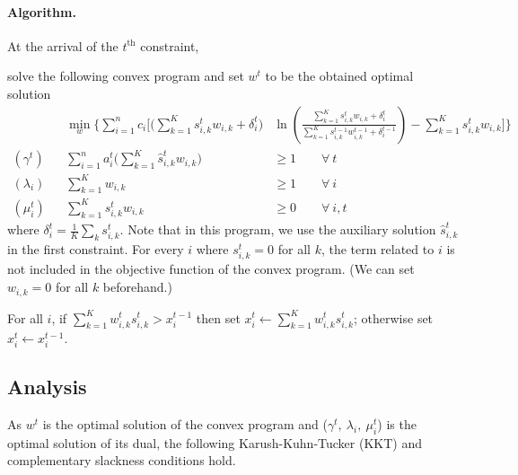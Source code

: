 \clearpage

\paragraph{Algorithm.}

At the arrival of the $t^{\text{th}}$ constraint,
\begin{compactenum}
	\item solve the following convex program and set $w^t$ to be the obtained optimal solution
%
\begin{align*}
&& \min_{w} \biggl\{\sum_{i=1}^{n} c_{i}  \biggl[  \biggl(\sum_{k=1}^{K} s_{i,k}^{t} w_{i,k}  + \delta_{i}^{t} \biggr) &
					 \ln \left( \frac{\sum_{k=1}^{K} s_{i,k}^{t} w_{i,k}  + \delta_{i}^{t}}{ \sum_{k=1}^{K}  s_{i,k}^{t-1}w_{i,k}^{t-1}  + \delta_{i}^{t-1}}  \right)
					 		- \sum_{k=1}^{K}  s_{i,k}^{t} w_{i,k} \biggr] \biggr\} \\
    (\gamma^{t})  && \sum_{i=1}^{n} a_{i}^{t} \biggl( \sum_{k=1}^{K}  \hat{s}_{i,k}^{t} w_{i,k} \biggr) &\geq 1 \qquad \forall\ t\\
%
    (\lambda_{i}) && \sum_{k=1}^{K}  w_{i,k} &\geq 1 \qquad \forall\ i\\
%
    (\mu_{i}^{t}) && \sum_{k=1}^{K} s_{i,k}^{t} w_{i,k} &\geq 0 \qquad \forall\ i,t
\end{align*}
%
where $\delta_{i}^{t} = \frac{1}{K} \sum_{k} s_{i,k}^{t}$.
Note that in this program, we use the auxiliary solution $\hat{s}_{i,k}^{t}$ in the first constraint. For every $i$ where $s_{i,k}^{t} = 0$ for all $k$, the term related to $i$ is not included in the objective function of the convex program.
(We can set $w_{i,k} = 0$ for all $k$ beforehand.)
	\item For all $i$, if $\sum_{k=1}^{K} w_{i,k}^{t} s_{i,k}^{t} > x_{i}^{t-1}$ then set $x_{i}^{t} \gets \sum_{k=1}^{K} w_{i,k}^{t} s_{i,k}^{t}$;
otherwise set $x_{i}^{t} \gets x_{i}^{t-1}$.
\end{compactenum}

\medskip

\subsection{Analysis}
As $w^{t}$ is the optimal solution of the convex program and ($\gamma^t,\ \lambda_{i},\ \mu_{i}^{t}$) is the optimal solution of its dual, the following Karush-Kuhn-Tucker (KKT) and complementary slackness conditions hold.

